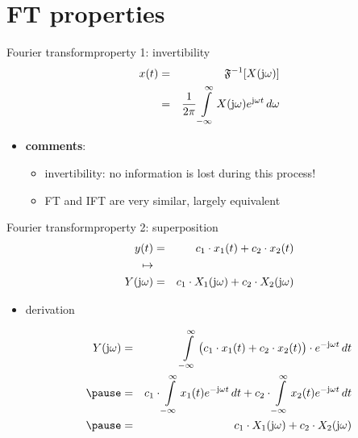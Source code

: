 \section{FT properties}
	\begin{frame}{Fourier transform}{property 1: invertibility}
		\begin{eqnarray*}\label{eq:ift}
			x(t) &=& \mathfrak{F}^{-1}[X(\mathrm{j}\omega)]\nonumber\\
			 &=& \frac{1}{2\pi}\int\limits_{-\infty}^{\infty} X(\mathrm{j}\omega) {e}^{\mathrm{j}\omega t}\, d\omega 
		\end{eqnarray*}
        \bigskip
 
        \begin{itemize}
            \pause
            \item   \textbf{comments}:
                \begin{itemize}
                    \item   invertibility: no information is lost during this process!
                    \item   FT and IFT are very similar, largely equivalent
                \end{itemize}
        \end{itemize}
        

	\end{frame}	

	\begin{frame}{Fourier transform}{property 2: superposition}
		\begin{eqnarray*}
			y(t) &=& c_1\cdot x_1(t) + c_2\cdot x_2(t)\nonumber\\
			\mapsto&&\nonumber\\
			Y(\mathrm{j}\omega) &=& c_1\cdot X_1(\mathrm{j}\omega) + c_2\cdot X_2(\mathrm{j}\omega)\nonumber
		\end{eqnarray*}
		\pause
		\begin{itemize}
			\item[]	derivation
					\begin{footnotesize}
						\begin{eqnarray*}
							Y(\jom) &=& \int\limits_{-\infty}^{\infty} {\big(c_1\cdot x_1(t) + c_2\cdot x_2(t)\big)\cdot \e^{-\jom t}\, dt}\nonumber\\
							\pause
							&=& c_1\cdot \int\limits_{-\infty}^{\infty} {x_1(t)  \e^{-\jom t}\, dt} + c_2\cdot \int\limits_{-\infty}^{\infty} {x_2(t) \e^{-\jom t}\, dt}\nonumber\\
							\pause
							&=& c_1\cdot X_1(\jom) + c_2\cdot X_2(\jom) 
						\end{eqnarray*}
					\end{footnotesize}
		\end{itemize}
	\end{frame}	

